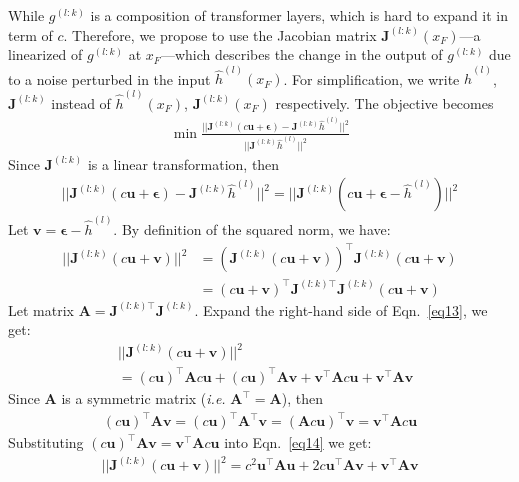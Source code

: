 \documentclass[letterpaper]{article} %
\begin{document}
While $g^{(l:k)}$ is a composition of transformer layers, which is hard to expand it in term of $c$. Therefore, we propose to use the Jacobian matrix $\bm J^{(l:k)}(x_F)$---a linearized of $g^{(l:k)}$ at $x_F$---which describes the change in the output of $g^{(l:k)}$ due to a noise perturbed in the input $\hat h^{(l)}(x_F)$. For simplification, we write $\hat h^{(l)}$, $\bm J^{(l:k)}$ instead of $\hat h^{(l)}(x_F)$, $\bm J^{(l:k)}(x_F)$ respectively. The objective becomes
\begin{align}
\min\frac{||\bm J^{(l:k)}(c\bm u +\bm \epsilon) - \bm J^{(l:k)} \hat h^{(l)}||^2}{||\bm J^{(l:k)} \hat h^{(l)}||^2} \label{eq11}
\end{align}
Since $\bm J^{(l:k)}$ is a linear transformation, then 
\begin{align}
    ||\bm J^{(l:k)}(c\bm u + \bm\epsilon) - \bm J^{(l:k)} \hat h^{(l)}||^2 = ||\bm J^{(l:k)}(c\bm u +\bm\epsilon - \hat h^{(l)})||^2
\end{align}
Let $\bm v = \bm\epsilon - \hat h^{(l)}$. By definition of the squared norm, we have:
\begin{align}
    ||\bm J^{(l:k)}(c\bm u + \bm v)||^2 &= (\bm J^{(l:k)}(c\bm u +\bm v))^{\top} \bm J^{(l:k)}(c\bm u +\bm v)
    \nonumber\\&=  (c\bm u + \bm v)^{\top}\bm{J}^{(l:k)\top}\bm J^{(l:k)}(c\bm u +\bm v)\label{eq13}
\end{align}
Let matrix $\bm A = \bm{J}^{(l:k)\top} \bm J^{(l:k)}$. Expand the right-hand side of Eqn.~\ref{eq13}, we get:
\begin{align}
     &||\bm J^{(l:k)}(c\bm u + \bm v)||^2 \nonumber\\&= (c\bm u)^{\top}\bm A c\bm u + (c\bm u)^{\top}\bm A \bm v + \bm v^{\top}\bm A c\bm u + \bm v^{\top}\bm A \bm v \label{eq14}
\end{align}
Since $\bm A$ is a symmetric matrix (\textit{i.e.} $\bm A^{\top} = \bm A$), then
\begin{align}
    (c\bm u)^{\top}\bm A \bm v = (c\bm u)^{\top} \bm A^{\top} \bm v = (\bm A c\bm u)^{\top} \bm v = \bm v^{\top} \bm A c\bm u \label{eq15}
\end{align}
Substituting $ (c\bm u)^{\top}\bm A \bm v = \bm v^{\top} \bm A c\bm u$ into Eqn.~\ref{eq14} we get:
\begin{align}
    ||\bm J^{(l:k)}(c\bm u + \bm v)||^2 = c^2\bm u^{\top}\bm A \bm u + 2c \bm u^{\top}\bm A \bm v + \bm v^{\top}\bm A \bm v \label{eq16}
\end{align}
\end{document}
